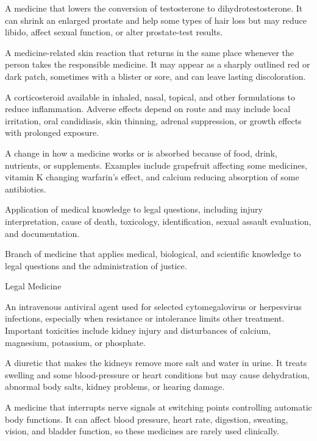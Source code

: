  A medicine that lowers the conversion of testosterone to dihydrotestosterone. It can shrink an enlarged prostate and help some types of hair loss but may reduce libido, affect sexual function, or alter prostate-test results.

 A medicine-related skin reaction that returns in the same place whenever the person takes the responsible medicine. It may appear as a sharply outlined red or dark patch, sometimes with a blister or sore, and can leave lasting discoloration.

 A corticosteroid available in inhaled, nasal, topical, and other formulations to reduce inflammation. Adverse effects depend on route and may include local irritation, oral candidiasis, skin thinning, adrenal suppression, or growth effects with prolonged exposure.

 A change in how a medicine works or is absorbed because of food, drink, nutrients, or supplements. Examples include grapefruit affecting some medicines, vitamin K changing warfarin’s effect, and calcium reducing absorption of some antibiotics.

 Application of medical knowledge to legal questions, including injury interpretation, cause of death, toxicology, identification, sexual assault evaluation, and documentation.

 Branch of medicine that applies medical, biological, and scientific knowledge to legal
questions and the administration of justice.

\synonyms
Legal Medicine

 An intravenous antiviral agent used for selected cytomegalovirus or herpesvirus infections, especially when resistance or intolerance limits other treatment. Important toxicities include kidney injury and disturbances of calcium, magnesium, potassium, or phosphate.

 A diuretic that makes the kidneys remove more salt and water in urine. It treats swelling and some blood-pressure or heart conditions but may cause dehydration, abnormal body salts, kidney problems, or hearing damage.

 A medicine that interrupts nerve signals at switching points controlling automatic body functions. It can affect blood pressure, heart rate, digestion, sweating, vision, and bladder function, so these medicines are rarely used clinically.

